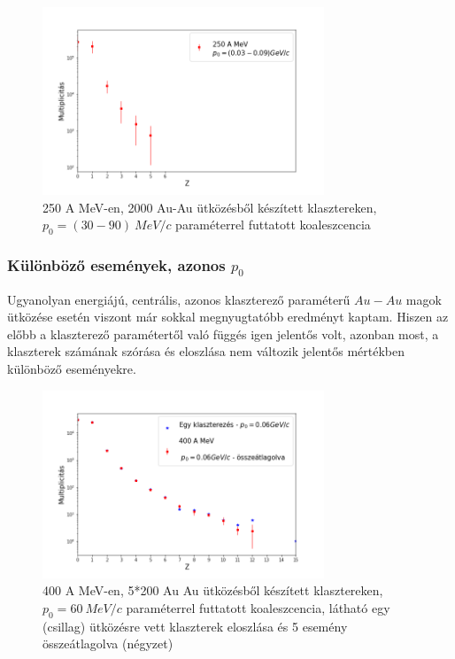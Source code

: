 \documentclass[a4paper,12pt]{article}
\begin{document}
\begin{figure}[!htb]
\centering
\includegraphics[width=0.75\textwidth]{./p0valtozik_klaszterek.png}
\caption{250 A MeV-en, 2000 Au-Au ütközésből készített klasztereken, $p_{0} = (30 - 90) ~MeV/c$ paraméterrel futtatott koaleszcencia}
\end{figure}

\vspace{5mm}

\subsubsection{ Különböző események, azonos $p_{0}$}

\par Ugyanolyan energiájú, centrális, azonos klaszterező paraméterű $Au-Au$ magok ütközése esetén viszont már sokkal megnyugtatóbb eredményt kaptam. Hiszen az előbb a klaszterező paramétertől való függés igen jelentős volt, azonban most, a klaszterek számának szórása és eloszlása nem változik jelentős mértékben különböző eseményekre. 


\begin{figure}[!htb]
\centering
\includegraphics[width=0.75\textwidth]{./p0allando_kulonbozoRandom.png}
\caption{400 A MeV-en, 5*200 Au Au ütközésből készített klasztereken, $p_{0} = 60 ~MeV/c$ paraméterrel futtatott koaleszcencia, látható egy (csillag) ütközésre vett klaszterek eloszlása és 5 esemény összeátlagolva (négyzet)}
\end{figure}
\end{document}
